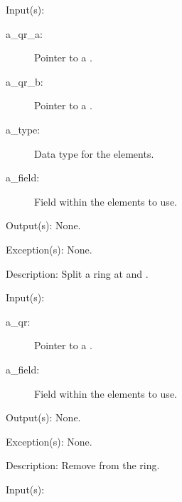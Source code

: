 \begin{capi}
\begin{capilist}
	\end{capilist}
\label{qr_split}
	\begin{capilist}
	\item[Input(s): ]
		\begin{description}\item[]
		\item[a\_qr\_a: ]
			Pointer to a .
		\item[a\_qr\_b: ]
			Pointer to a .
		\item[a\_type: ]
			Data type for the  elements.
		\item[a\_field: ]
			Field within the  elements to use.
		\end{description}
	\item[Output(s): ] None.
	\item[Exception(s): ] None.
	\item[Description: ]
		Split a ring at  and .
	\end{capilist}
\label{qr_remove}
	\begin{capilist}
	\item[Input(s): ]
		\begin{description}\item[]
		\item[a\_qr: ]
			Pointer to a \classname{qr}.
		\item[a\_field: ]
			Field within the  elements to use.
		\end{description}
	\item[Output(s): ] None.
	\item[Exception(s): ] None.
	\item[Description: ]
		Remove  from the ring.
	\end{capilist}
\label{qr_foreach}
	\begin{capilist}
	\item[Input(s): ]
		\begin{description}\item[]

\end{description}
\end{capilist}
\end{capi}

